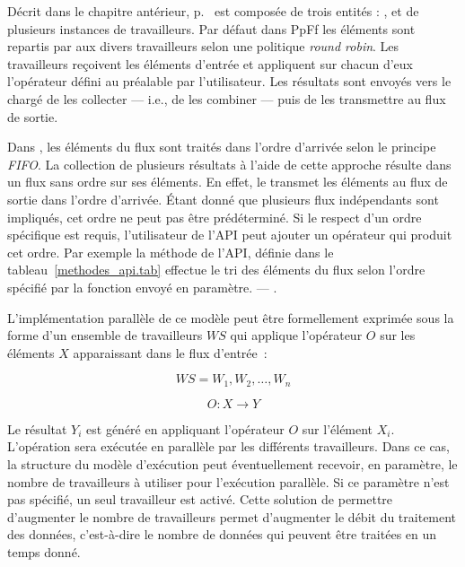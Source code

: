 D\'ecrit dans le chapitre ant\'erieur, p.~\pageref{farm.sect}  est compos\'ee de trois entit\'es : ,  et de plusieurs instances de travailleurs. Par d\'efaut dans PpFf les \'el\'ements sont repartis par  aux divers travailleurs selon une politique \emph{round robin}. Les travailleurs re\c{c}oivent les \'el\'ements d'entr\'ee et appliquent sur chacun d'eux l'op\'erateur d\'efini au pr\'ealable par l'utilisateur. Les r\'esultats sont envoy\'es vers le  charg\'e de les collecter --- i.e., de les combiner --- puis de les transmettre au flux de sortie.

Dans , les \'el\'ements du flux sont trait\'es dans l'ordre d'arriv\'ee selon le principe \emph{FIFO}. La collection de plusieurs r\'esultats \`a l'aide de cette approche r\'esulte dans un flux sans ordre sur ses \'el\'ements. En effet, le  transmet les \'el\'ements au flux de sortie dans l'ordre d'arriv\'ee. \'Etant donn\'e que plusieurs flux ind\'ependants sont impliqu\'es, cet ordre ne peut pas \^etre pr\'ed\'etermin\'e. Si le respect d'un  ordre sp\'ecifique est requis, l'utilisateur de l'API peut ajouter un op\'erateur qui produit cet ordre. Par exemple la m\'ethode  de l'API, d\'efinie dans le tableau~\ref{methodes_api.tab} effectue le tri des \'el\'ements du flux selon l'ordre sp\'ecifi\'e par la fonction  envoy\'e en param\`etre. --- . 

L'impl\'ementation parall\`ele de ce mod\`ele peut \^etre formellement
exprim\'ee sous la forme d'un ensemble de travailleurs $WS$ qui
applique l'op\'erateur $O$ sur les \'el\'ements $X$ apparaissant dans
le flux d'entr\'ee~:

\[
	WS = {W_1, W_2,\ldots, W_n}
\]

\[
	O : X \rightarrow Y
\]

Le r\'esultat $Y_i$ est g\'en\'er\'e en appliquant l'op\'erateur $O$ sur l'\'el\'ement $X_i$. L'op\'eration sera ex\'ecut\'ee en parall\`ele par les diff\'erents travailleurs. Dans ce cas, la structure du mod\`ele d'ex\'ecution peut \'eventuellement recevoir, en param\`etre, le nombre de travailleurs \`a utiliser pour l'ex\'ecution parall\`ele. Si ce param\`etre n'est pas sp\'ecifi\'e, un seul travailleur est activ\'e. Cette solution de permettre d'augmenter le nombre de travailleurs permet d'augmenter le d\'ebit du traitement des donn\'ees, c'est-\`a-dire le nombre de donn\'ees qui peuvent \^etre trait\'ees en un temps donn\'e.






